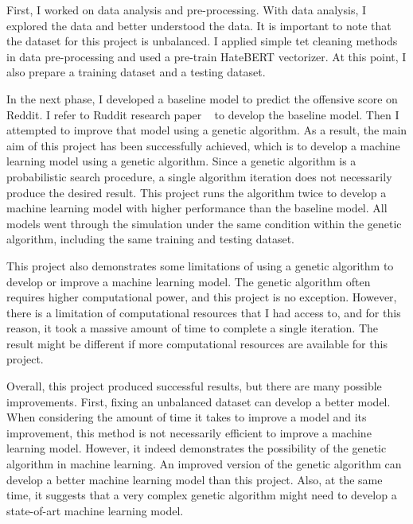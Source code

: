 \documentclass[11pt, natbib=false]{article}
\begin{document}
First, I worked on data analysis and pre-processing.
With data analysis, I explored the data and better understood the data.
It is important to note that the dataset for this project is unbalanced.
I applied simple tet cleaning methods in data pre-processing and used a pre-train HateBERT vectorizer.
At this point, I also prepare a training dataset and a testing dataset.

In the next phase, I developed a baseline model to predict the offensive score on Reddit.
I refer to Ruddit research paper ~\cite{hada2021ruddit} to develop the baseline model.
Then I attempted to improve that model using a genetic algorithm.
As a result, the main aim of this project has been successfully achieved, which is to develop a machine learning model using a genetic algorithm.
Since a genetic algorithm is a probabilistic search procedure, a single algorithm iteration does not necessarily produce the desired result.
This project runs the algorithm twice to develop a machine learning model with higher performance than the baseline model.
All models went through the simulation under the same condition within the genetic algorithm, including the same training and testing dataset.

This project also demonstrates some limitations of using a genetic algorithm to develop or improve a machine learning model.
The genetic algorithm often requires higher computational power, and this project is no exception.
However, there is a limitation of computational resources that I had access to, and for this reason, it took a massive amount of time to complete a single iteration.
The result might be different if more computational resources are available for this project.

Overall, this project produced successful results, but there are many possible improvements.
First, fixing an unbalanced dataset can develop a better model.
When considering the amount of time it takes to improve a model and its improvement, this method is not necessarily efficient to improve a machine learning model.
However, it indeed demonstrates the possibility of the genetic algorithm in machine learning.
An improved version of the genetic algorithm can develop a better machine learning model than this project.
Also, at the same time, it suggests that a very complex genetic algorithm might need to develop a state-of-art machine learning model.



\newpage
\printbibliography
\newpage
\end{document}
